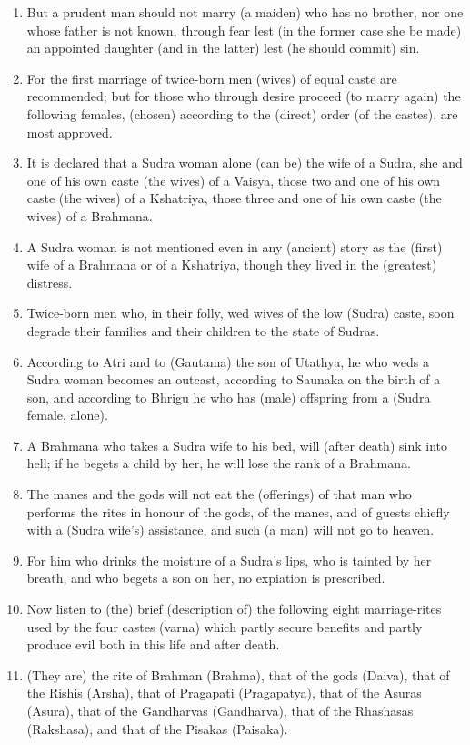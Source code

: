 \begin{enumerate}
\item But a prudent man should not marry (a maiden) who has no brother, nor one whose father is not known, through fear lest (in the former case she be made) an appointed daughter (and in the latter) lest (he should commit) sin.
\item For the first marriage of twice-born men (wives) of equal caste are recommended; but for those who through desire proceed (to marry again) the following females, (chosen) according to the (direct) order (of the castes), are most approved.
\item It is declared that a Sudra woman alone (can be) the wife of a Sudra, she and one of his own caste (the wives) of a Vaisya, those two and one of his own caste (the wives) of a Kshatriya, those three and one of his own caste (the wives) of a Brahmana.
\item A Sudra woman is not mentioned even in any (ancient) story as the (first) wife of a Brahmana or of a Kshatriya, though they lived in the (greatest) distress.
\item Twice-born men who, in their folly, wed wives of the low (Sudra) caste, soon degrade their families and their children to the state of Sudras.
\item According to Atri and to (Gautama) the son of Utathya, he who weds a Sudra woman becomes an outcast, according to Saunaka on the birth of a son, and according to Bhrigu he who has (male) offspring from a (Sudra female, alone).
\item A Brahmana who takes a Sudra wife to his bed, will (after death) sink into hell; if he begets a child by her, he will lose the rank of a Brahmana.
\item The manes and the gods will not eat the (offerings) of that man who performs the rites in honour of the gods, of the manes, and of guests chiefly with a (Sudra wife's) assistance, and such (a man) will not go to heaven.
\item For him who drinks the moisture of a Sudra's lips, who is tainted by her breath, and who begets a son on her, no expiation is prescribed.
\item Now listen to (the) brief (description of) the following eight marriage-rites used by the four castes (varna) which partly secure benefits and partly produce evil both in this life and after death.
\item (They are) the rite of Brahman (Brahma), that of the gods (Daiva), that of the Rishis (Arsha), that of Pragapati (Pragapatya), that of the Asuras (Asura), that of the Gandharvas (Gandharva), that of the Rhashasas (Rakshasa), and that of the Pisakas (Paisaka).

\end{enumerate}
